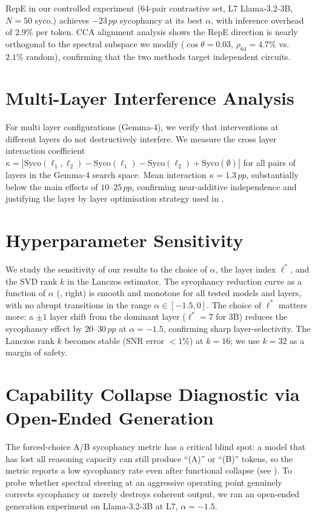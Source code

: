 \documentclass{article}
\newcommand{\pp}{\,pp}
\begin{document}
RepE in our controlled experiment (64-pair contrastive set, L7 Llama-3.2-3B,
$N{=}50$ syco.) achieves $-23\pp$ sycophancy at its best $\alpha$, with
inference overhead of $2.9\%$ per token. CCA alignment analysis shows the
RepE direction is nearly orthogonal to the spectral subspace we modify
($\cos\theta{=}0.03$, $\rho_{64}{=}4.7\%$ vs.\ $2.1\%$ random),
confirming that the two methods target independent circuits.

\section{Multi-Layer Interference Analysis}
\label{app:interference}

For multi layer configurations (Gemma-4), we verify that interventions
at different layers do not destructively interfere. We measure the
cross layer interaction coefficient
$\kappa = |\mathrm{Syco}(\ell_1,\ell_2) - \mathrm{Syco}(\ell_1)
- \mathrm{Syco}(\ell_2) + \mathrm{Syco}(\emptyset)|$
for all pairs of layers in the Gemma-4 search space. Mean interaction
$\kappa{=}1.3\pp$, substantially below the main effects of
$10$--$25\pp$, confirming near-additive independence and justifying
the layer by layer optimisation strategy used in
.

\section{Hyperparameter Sensitivity}
\label{app:sensitivity}

We study the sensitivity of our results to the choice of $\alpha$,
the layer index $\ell^{*}$, and the SVD rank $k$ in the Lanczos
estimator. The sycophancy reduction curve as a function of $\alpha$
(, right) is smooth and monotone for all tested
models and layers, with no abrupt transitions in the range
$\alpha\in[-1.5,0]$. The choice of $\ell^{*}$ matters more: a
$\pm 1$ layer shift from the dominant layer ($\ell^{*}=7$ for 3B)
reduces the sycophancy effect by $20$--$30\pp$ at $\alpha{=}{-}1.5$,
confirming sharp layer-selectivity. The Lanczos rank $k$ becomes
stable (SNR error $<1\%$) at $k{=}16$; we use $k{=}32$ as a margin of
safety.

\section{Capability Collapse Diagnostic via Open-Ended Generation}
\label{app:open_ended}

The forced-choice A/B sycophancy metric has a critical blind spot: a model that
has lost all reasoning capacity can still produce ``(A)'' or ``(B)'' tokens,
so the metric reports a low sycophancy rate even after functional collapse
(see ). To probe whether spectral steering at an
aggressive operating point genuinely corrects sycophancy or merely destroys
coherent output, we ran an open-ended generation experiment on Llama-3.2-3B
at L7, $\alpha{=}{-}1.5$.
\end{document}
